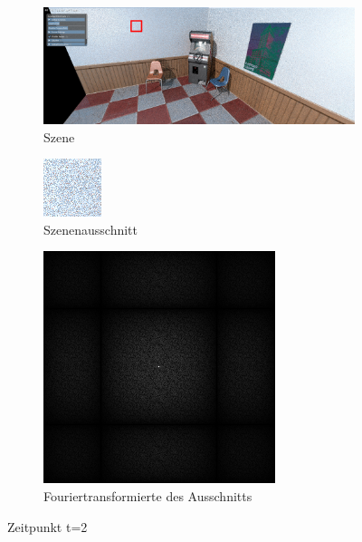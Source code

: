 \begin{figure}[H]
    \begin{subfigure}{\textwidth}
        \centering \includegraphics[scale=.2]{content/TemporalerAlg/Bilder/Screenshotreihe/frame_t_3.0.png}
        \caption{Szene}
        \label{fig:Szene_t1}
    \end{subfigure}
    \begin{subfigure}{0.5\textwidth}
        \centering\includegraphics[width=0.5\linewidth]{content/TemporalerAlg/Bilder/Screenshotreihe/frame_t_3.0_64x64.png} 
        \caption{Szenenausschnitt}
        \label{fig:ausschnitt_t2}
    \end{subfigure}
    \begin{subfigure}{0.5\textwidth}
        \centering\includegraphics[width=0.5\linewidth]{content/TemporalerAlg/Bilder/Screenshotreihe/spektrum/frame_t_3.0_64x64_fourier.png}
        \caption{Fouriertransformierte des Ausschnitts}
        \label{fig:Fouriertransformierte_t2}
    \end{subfigure}
        \caption{Zeitpunkt t=2}
        \label{fig:Verlauf_t2}
\end{figure}

